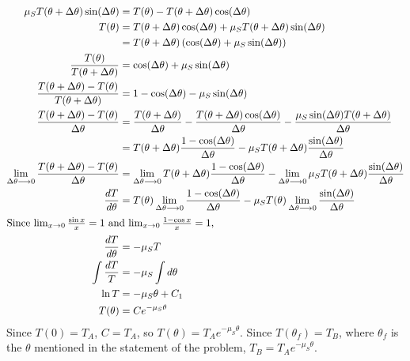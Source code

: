 \documentclass{esg8012pset}
\begin{document}
\begin{solution}
\begin{align*}
    \mu_S T(\theta + \Delta\theta)\sin(\Delta\theta) & = T(\theta) - T(\theta + \Delta\theta)\cos(\Delta\theta) \\
    T(\theta) & = T(\theta + \Delta\theta)\cos(\Delta\theta) + \mu_S T(\theta + \Delta\theta)\sin(\Delta\theta) \\
     & = T(\theta + \Delta\theta)\left(\cos(\Delta\theta) + \mu_S \sin(\Delta\theta)\right) \\
    \frac{T(\theta)}{T(\theta + \Delta\theta)} & = \cos(\Delta\theta) + \mu_S \sin(\Delta\theta) \\
    \frac{T(\theta + \Delta\theta) - T(\theta)}{T(\theta + \Delta\theta)} & = 1 - \cos(\Delta\theta) - \mu_S \sin(\Delta\theta) \\
    \frac{T(\theta + \Delta\theta) - T(\theta)}{\Delta\theta} & = \frac{T(\theta + \Delta\theta)}{\Delta\theta} - \frac{T(\theta + \Delta\theta)\cos(\Delta\theta)}{\Delta\theta} - \frac{\mu_S \sin(\Delta\theta)T(\theta + \Delta\theta)}{\Delta\theta} \\
    & = T(\theta + \Delta\theta)\frac{1 -\cos(\Delta\theta)}{\Delta\theta} - \mu_S T(\theta + \Delta\theta)\frac{\sin(\Delta\theta)}{\Delta\theta} \\
    \lim_{\Delta\theta \longrightarrow 0} \frac{T(\theta + \Delta\theta) - T(\theta)}{\Delta\theta} & = \lim_{\Delta\theta \longrightarrow 0} T(\theta + \Delta\theta)\frac{1 -\cos(\Delta\theta)}{\Delta\theta} - \lim_{\Delta\theta \longrightarrow 0} \mu_S T(\theta + \Delta\theta)\frac{\sin(\Delta\theta)}{\Delta\theta} \\
    \frac{d T}{d\theta} & = T(\theta)\lim_{\Delta\theta \longrightarrow 0} \frac{1 -\cos(\Delta\theta)}{\Delta\theta} - \mu_S T(\theta)\lim_{\Delta\theta \longrightarrow 0} \frac{\sin(\Delta\theta)}{\Delta\theta} \\
  \intertext{Since $\lim_{x\rightarrow 0}\frac{\sin x}{x} = 1$ and $\lim_{x\rightarrow 0}\frac{1-\cos x}{x} = 1$,}
    \frac{d T}{d\theta} & = -\mu_S T \\
    \int \frac{d T}{T} & = -\mu_S\int d \theta \\
    \ln T & = -\mu_S \theta + C_1 \\
    T(\theta) & = Ce^{-\mu_S\theta}
  \end{align*}
  Since $T(0) = T_A$, $C = T_A$, so $T(\theta) = T_A e^{-\mu_S \theta}$.  Since $T(\theta_f) = T_B$, where $\theta_f$ is the $\theta$ mentioned in the statement of the problem, $T_B = T_A e^{-\mu_S \theta}$.
\end{solution}
\end{document}
